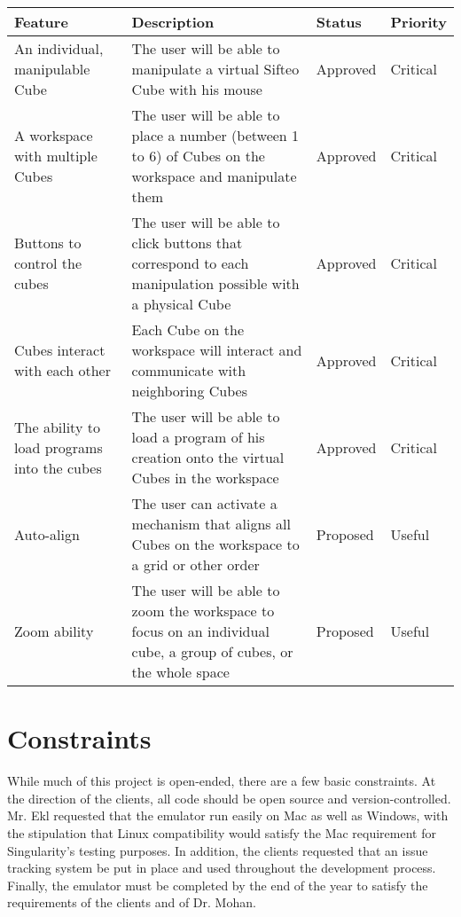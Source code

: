 \documentclass[12pt]{article}
\begin{document}
    \begin{table}[h]
      \begin{tabular}{p{1.5in} | p{1.75in} | p{1in} | p{1in}}
        \textbf{Feature} & \textbf{Description} & \textbf{Status} & \textbf{Priority} \\ \hline

        An individual, manipulable Cube &
        The user will be able to manipulate a virtual Sifteo Cube with his mouse &
        Approved &
        Critical \\ \hline

        A workspace with multiple Cubes &
        The user will be able to place a number (between 1 to 6) of Cubes on the workspace and manipulate them &
        Approved &
        Critical \\ \hline

        Buttons to control the cubes &
        The user will be able to click buttons that correspond to each manipulation possible with a physical Cube &
        Approved &
        Critical \\ \hline

        Cubes interact with each other &
        Each Cube on the workspace will interact and communicate with neighboring Cubes &
        Approved &
        Critical \\ \hline

        The ability to load programs into the cubes &
        The user will be able to load a program of his creation onto the virtual Cubes in the workspace &
        Approved &
        Critical \\ \hline

        Auto-align &
        The user can activate a mechanism that aligns all Cubes on the workspace to a grid or other order &
        Proposed &
        Useful \\ \hline

        Zoom ability &
        The user will be able to zoom the workspace to focus on an individual cube, a group of cubes, or the whole space &
        Proposed &
        Useful
      \end{tabular}
    \end{table}

\section{Constraints}
        While much of this project is open-ended, there are a few basic constraints. At the direction of the clients, all code should be open source and version-controlled. Mr. Ekl requested that the emulator run easily on Mac as well as Windows, with the stipulation that Linux compatibility would satisfy the Mac requirement for Singularity's testing purposes. In addition, the clients requested that an issue tracking system be put in place and used throughout the development process. Finally, the emulator must be completed by the end of the year to satisfy the requirements of the clients and of Dr. Mohan.
\end{document}
